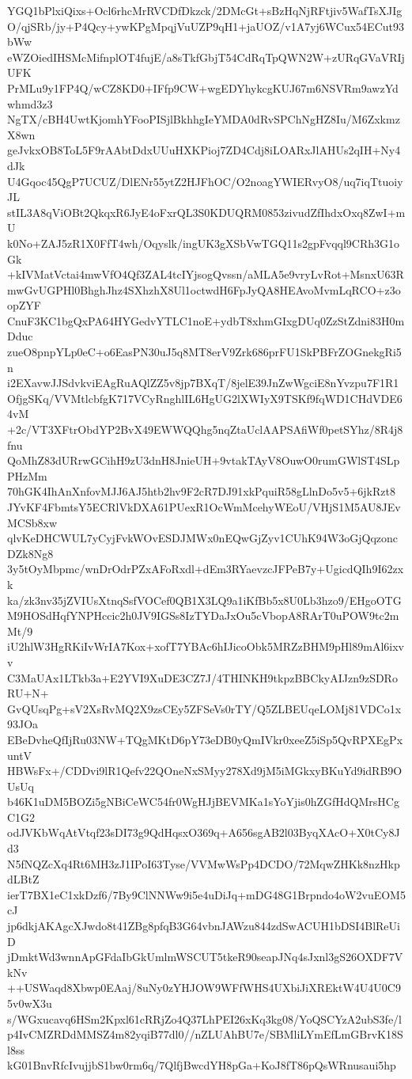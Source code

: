 YGQ1bPlxiQixs+Ocl6rhcMrRVCDfDkzck/2DMcGt+sBzHqNjRFtjiv5WafTsXJIg
O/qjSRb/jy+P4Qcy+ywKPgMpqjVuUZP9qH1+jaUOZ/v1A7yj6WCux54ECut93bWw
eWZOiedIHSMcMifnplOT4fujE/a8sTkfGbjT54CdRqTpQWN2W+zURqGVaVRIjUFK
PrMLu9y1FP4Q/wCZ8KD0+IFfp9CW+wgEDYhykcgKUJ67m6NSVRm9awzYdwhmd3z3
NgTX/cBH4UwtKjomhYFooPISjlBkhhgIeYMDA0dRvSPChNgHZ8Iu/M6ZxkmzX8wn
geJvkxOB8ToL5F9rAAbtDdxUUuHXKPioj7ZD4Cdj8iLOARxJlAHUs2qIH+Ny4dJk
U4Gqoc45QgP7UCUZ/DlENr55ytZ2HJFhOC/O2noagYWIERvyO8/uq7iqTtuoiyJL
stIL3A8qViOBt2QkqxR6JyE4oFxrQL3S0KDUQRM0853zivudZfIhdxOxq8ZwI+mU
k0No+ZAJ5zR1X0FfT4wh/Oqyslk/ingUK3gXSbVwTGQ11s2gpFvqql9CRh3G1oGk
+kIVMatVctai4mwVfO4Qf3ZAL4tcIYjsogQvssn/aMLA5e9vryLvRot+MsnxU63R
mwGvUGPHl0BhghJhz4SXhzhX8Ul1octwdH6FpJyQA8HEAvoMvmLqRCO+z3oopZYF
CnuF3KC1bgQxPA64HYGedvYTLC1noE+ydbT8xhmGIxgDUq0ZzStZdni83H0mDduc
zueO8pnpYLp0eC+o6EasPN30uJ5q8MT8erV9Zrk686prFU1SkPBFrZOGnekgRi5n
i2EXavwJJSdvkviEAgRuAQlZZ5v8jp7BXqT/8jelE39JnZwWgciE8nYvzpu7F1R1
OfjgSKq/VVMtlcbfgK717VCyRnghlIL6HgUG2lXWIyX9TSKf9fqWD1CHdVDE64vM
+2c/VT3XFtrObdYP2BvX49EWWQQhg5nqZtaUclAAPSAfiWf0petSYhz/8R4j8fnu
QoMhZ83dURrwGCihH9zU3dnH8JnieUH+9vtakTAyV8OuwO0rumGWlST4SLpPHzMm
70hGK4IhAnXnfovMJJ6AJ5htb2hv9F2cR7DJ91xkPquiR58gLlnDo5v5+6jkRzt8
JYvKF4FbmtsY5ECRlVkDXA61PUexR1OcWmMcehyWEoU/VHjS1M5AU8JEvMCSb8xw
qlvKeDHCWUL7yCyjFvkWOvESDJMWx0nEQwGjZyv1CUhK94W3oGjQqzoncDZk8Ng8
3y5tOyMbpmc/wnDrOdrPZxAFoRxdl+dEm3RYaevzcJFPeB7y+UgicdQIh9I62zxk
ka/zk3nv35jZVIUsXtnqSsfVOCef0QB1X3LQ9a1iKfBb5x8U0Lb3hzo9/EHgoOTG
M9HOSdHqfYNPHccic2h0JV9IGSs8IzTYDaJxOu5cVbopA8RArT0uPOW9tc2mMt/9
iU2hlW3HgRKiIvWrIA7Kox+xofT7YBAc6hIJicoObk5MRZzBHM9pHl89mAl6ixvv
C3MaUAx1LTkb3a+E2YVI9XuDE3CZ7J/4THINKH9tkpzBBCkyAIJzn9zSDRoRU+N+
GvQUsqPg+sV2XsRvMQ2X9zsCEy5ZFSeVs0rTY/Q5ZLBEUqeLOMj81VDCo1x93JOa
EBeDvheQfIjRu03NW+TQgMKtD6pY73eDB0yQmIVkr0xeeZ5iSp5QvRPXEgPxuntV
HBWsFx+/CDDvi9lR1Qefv22QOneNxSMyy278Xd9jM5iMGkxyBKuYd9idRB9OUsUq
b46K1uDM5BOZi5gNBiCeWC54fr0WgHJjBEVMKa1sYoYjis0hZGfHdQMrsHCgC1G2
odJVKbWqAtVtqf23sDI73g9QdHqsxO369q+A656sgAB2l03ByqXAcO+X0tCy8Jd3
N5fNQZcXq4Rt6MH3zJ1IPoI63Tyse/VVMwWsPp4DCDO/72MqwZHKk8nzHkpdLBtZ
ierT7BX1eC1xkDzf6/7By9ClNNWw9i5e4uDiJq+mDG48G1Brpndo4oW2vuEOM5cJ
jp6dkjAKAgcXJwdo8t41ZBg8pfqB3G64vbnJAWzu844zdSwACUH1bDSI4BlReUiD
jDmktWd3wnnApGFdaIbGkUmlmWSCUT5tkeR90seapJNq4sJxnl3gS26OXDF7VkNv
++USWaqd8Xbwp0EAaj/8uNy0zYHJOW9WFfWHS4UXbiJiXREktW4U4U0C95v0wX3u
s/WGxucavq6HSm2Kpxl61cRRjZo4Q37LhPEI26xKq3kg08/YoQSCYzA2ubS3fe/l
p4IvCMZRDdMMSZ4m82yqiB77dl0//nZLUAhBU7e/SBMliLYmEfLmGBrvK18Sl8ss
kG01BnvRfcIvujjbS1bw0rm6q/7QlfjBwcdYH8pGa+KoJ8fT86pQsWRnusaui5hp
